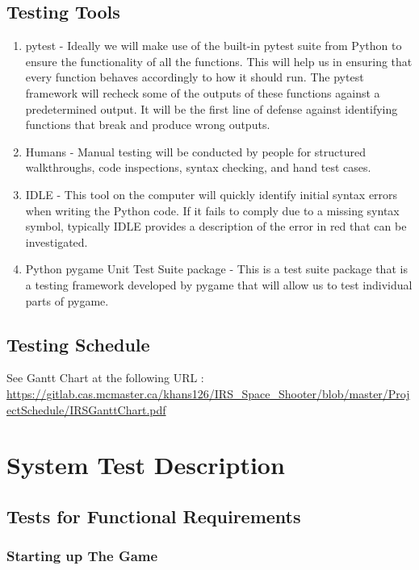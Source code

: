 \documentclass[12pt, titlepage]{article}
\begin{document}
\subsection{Testing Tools}
\begin{enumerate}
\item pytest - Ideally we will make use of the built-in pytest suite from Python to ensure the functionality of all the functions. This will help us in ensuring that every function behaves accordingly to how it should run. The pytest framework will recheck some of the outputs of these functions against a predetermined output. It will be the first line of defense against identifying functions that break and produce wrong outputs.
\item Humans - Manual testing will be conducted by people for structured walkthroughs, code inspections, syntax checking, and hand test cases. 
\item IDLE - This tool on the computer will quickly identify initial syntax errors when writing the Python code. If it fails to comply due to a missing syntax symbol, typically IDLE provides a description of the error in red that can be investigated. 
\item Python pygame Unit Test Suite package - This is a test suite package that is a testing framework developed by pygame that will allow us to test individual parts of pygame. 
\end{enumerate}

\subsection{Testing Schedule}
        
See Gantt Chart at the following URL : \url{https://gitlab.cas.mcmaster.ca/khans126/IRS_Space_Shooter/blob/master/ProjectSchedule/IRSGanttChart.pdf}

\newpage

\section{System Test Description}

\subsection{Tests for Functional Requirements}

\subsubsection{Starting up The Game}
        
\end{document}
